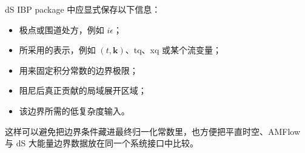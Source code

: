 \documentclass[a4paper,11pt]{article}
\begin{document}
dS IBP package 中应显式保存以下信息：
\begin{itemize}
    \item 极点或围道处方，例如 $i\epsilon$；
    \item 所采用的表示，例如 $(t,\mathbf{k})$、tq、xq 或某个流变量；
    \item 用来固定积分常数的边界极限；
    \item 阻尼后真正贡献的局域展开区域；
    \item 该边界所需的低复杂度输入。
\end{itemize}
这样可以避免把边界条件藏进最终归一化常数里，也方便把平直时空、AMFlow 与 dS 大能量边界数据放在同一个系统接口中比较。



\end{document}
